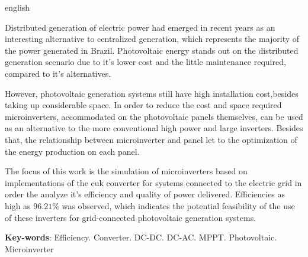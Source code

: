 \documentclass[
	12pt,				%
	openright,			%
	twoside,			%
	a4paper,			%
	english,			%
	french,				%
	spanish,			%
	brazil,				%
	]{abntex2}
\begin{document}
	\begin{resumo}[Abstract]
		\begin{otherlanguage*}{english}

		Distributed generation of electric power had emerged in recent years as an interesting alternative to centralized generation, which represents the majority of the power generated in Brazil. Photovoltaic energy stands out on the distributed generation scenario due to it's lower cost and the little maintenance required, compared to it's alternatives. 

		However, photovoltaic generation systems still have high installation cost,besides taking up considerable space. In order to reduce the cost and space required microinverters, accommodated on the photovoltaic panels themselves, can be used as an alternative to the more conventional high power and large inverters. Besides that, the relationship between microinverter and panel let to the optimization of the energy production on each panel.

		The focus of this work is the simulation  of microinverters based on implementations of the cuk converter for systems connected to the electric grid in order the analyze it's efficiency and quality of power delivered. Efficiencies as high as $96.21\%$ was observed, which indicates the potential feasibility of the use of these inverters for grid-connected photovoltaic generation systems.

		\vspace{\onelineskip}
		\noindent
		\textbf{Key-words}: Efficiency. Converter. DC-DC. DC-AC. MPPT. Photovoltaic. Microinverter
	\end{otherlanguage*}
	\end{resumo}

	\listoffigures*
	\clearpage

	\listoftables*
	\clearpage
\end{document}
